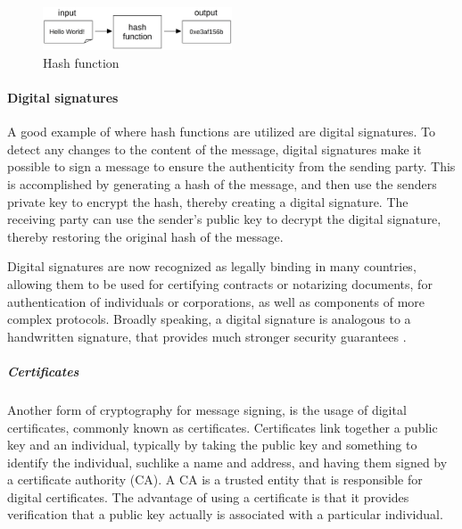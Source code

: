 \begin{figure}[!h]
    \centering
    \includegraphics[width=0.5\textwidth]{../../img/chapter_2/hash-functions.jpg}
    \caption{Hash function}\label{fig:hash}
\end{figure}

\paragraph{Digital signatures}
A good example of where hash functions are utilized are digital signatures. To detect any changes to the content of the message, digital signatures make it possible to sign a message to ensure the authenticity from the sending party. This is accomplished by generating a hash of the message, and then use the senders private key to encrypt the hash, thereby creating a digital signature. The receiving party can use the sender's public key to decrypt the digital signature, thereby restoring the original hash of the message.

Digital signatures are now recognized as legally binding in many countries, allowing them to be used for certifying contracts or notarizing documents, for authentication of individuals or corporations, as well as components of more complex protocols. Broadly speaking, a digital signature is analogous to a handwritten signature, that provides much stronger security guarantees \cite{katz2010digital}. 

\subparagraph{Certificates}
Another form of cryptography for message signing, is the usage of digital certificates, commonly known as certificates. Certificates link together a public key and an individual, typically by taking the public key and something to identify the individual, suchlike a name and address, and having them signed by a certificate authority (CA). A CA is a trusted entity that is responsible for digital certificates. The advantage of using a certificate is that it provides verification that a public key actually is associated with a particular individual.
